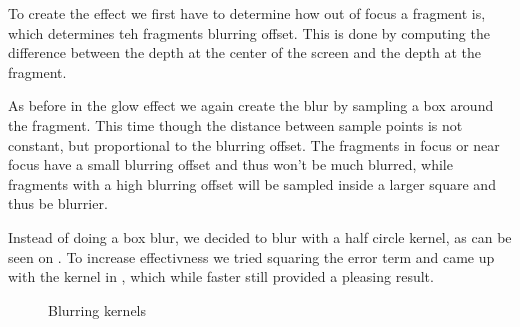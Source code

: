 To create the effect we first have to determine how out of focus a
fragment is, which determines teh fragments blurring offset. This is
done by computing the difference between the depth at the center of
the screen and the depth at the fragment.

As before in the glow effect we again create the blur by sampling a
box around the fragment. This time though the distance between sample
points is not constant, but proportional to the blurring offset. The
fragments in focus or near focus have a small blurring offset and thus
won't be much blurred, while fragments with a high blurring offset
will be sampled inside a larger square and thus be blurrier.

Instead of doing a box blur, we decided to blur with a half circle
kernel, as can be seen on . To increase
effectivness we tried squaring the error term and came up with the
kernel in , which while faster still
provided a pleasing result.

\begin{figure}
  \centering
  \caption{Blurring kernels}
\end{figure}
        

